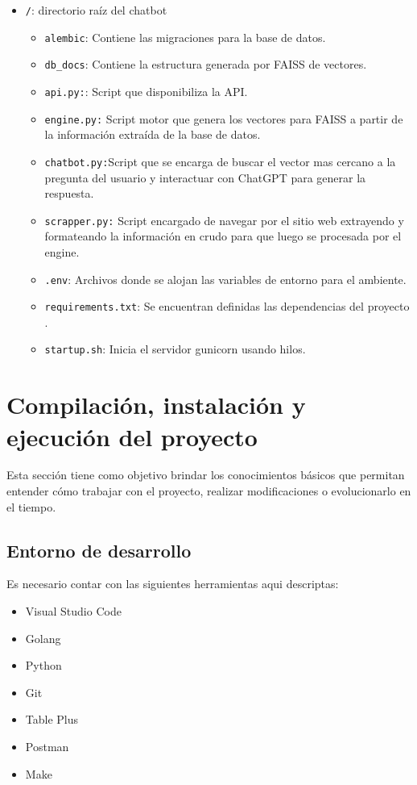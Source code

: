 \begin{itemize}
\tightlist
\item
  \texttt{/}: directorio raíz del chatbot
  \begin{itemize}
  \tightlist
  \item 
    \texttt{alembic}: Contiene las migraciones para la base de datos.
  \item 
    \texttt{db\_docs}: Contiene la estructura generada por FAISS de vectores.
  \item 
   \texttt{api.py:}: Script que disponibiliza la API.
   \item 
   \texttt{engine.py:} Script motor que genera los vectores para FAISS a partir de la información extraída de la base de datos.
    \item 
    \texttt{chatbot.py:}Script que se encarga de buscar el vector mas cercano a la pregunta del usuario y interactuar con ChatGPT para generar la respuesta.
    \item 
    \texttt{scrapper.py:} Script encargado de navegar por el sitio web extrayendo y formateando la información en crudo para que luego se procesada por el engine.
   \item 
   \texttt{.env}: Archivos donde se alojan las variables de entorno para el ambiente.
    \item 
   \texttt{requirements.txt}: Se encuentran definidas las dependencias del proyecto .
    \item 
   \texttt{startup.sh}: Inicia el servidor gunicorn usando hilos.
    \end{itemize}
\end{itemize}

 
\section{Compilación, instalación y ejecución del proyecto}
Esta sección tiene como objetivo brindar los conocimientos básicos que permitan entender cómo trabajar con el proyecto, realizar modificaciones o evolucionarlo en el tiempo.

 \subsection{Entorno de desarrollo}
Es necesario contar con las siguientes herramientas aqui descriptas:
 
 \begin{itemize}
  \tightlist
  \item Visual Studio Code
  \item Golang
  \item Python
  \item Git
  \item Table Plus
  \item Postman
  \item Make
\end{itemize}

